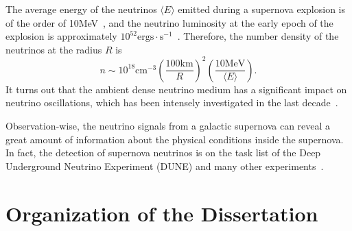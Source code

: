 The average energy of the neutrinos $\langle E \rangle$ emitted during a supernova explosion is of the order of 10MeV~\cite{Janka2017}, and the neutrino luminosity at the early epoch of the explosion is approximately $10^{52}\mathrm{ergs\cdot s^{-1}}$~\cite{Pejcha2012a}.
Therefore, the number density of the neutrinos at the radius $R$ is
\begin{equation*}
   n \sim  10^{18} \mathrm{cm^{-3}} \left(\frac{100\mathrm{km}}{R}\right)^2 \left(\frac{10\mathrm{MeV}}{\langle E \rangle}\right).
\end{equation*}
It turns out that the ambient dense neutrino medium has a significant impact on neutrino oscillations, which has been intensely investigated in the last decade~\cite{Duan2010}.

Observation-wise, the neutrino signals from a galactic supernova can reveal a great amount of information about the physical conditions inside the supernova. In fact, the detection of supernova neutrinos is on the task list of the Deep Underground Neutrino Experiment (DUNE) and many other experiments~\cite{Kemp2017}.




\section{Organization of the Dissertation}


